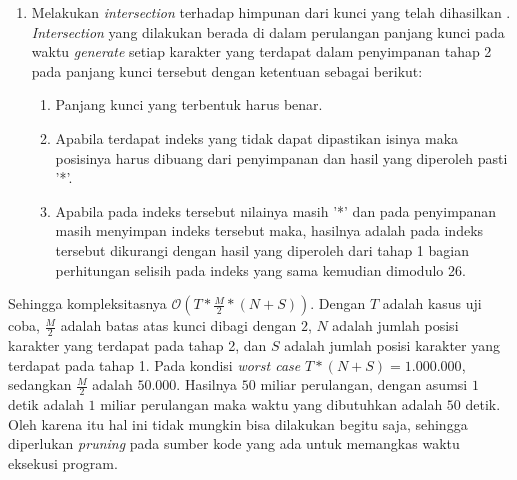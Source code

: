 \begin{enumerate}
	\item Melakukan \textit{intersection} terhadap himpunan dari kunci yang telah dihasilkan  \cite{john_jones_spoj_2009}. \textit{Intersection} yang dilakukan berada di dalam perulangan panjang kunci pada waktu \textit{generate} setiap karakter yang terdapat dalam penyimpanan tahap 2 pada panjang kunci tersebut dengan ketentuan sebagai berikut:
	\begin{enumerate}
	\item Panjang kunci yang terbentuk harus benar.
	\item Apabila terdapat indeks yang tidak dapat dipastikan isinya maka posisinya harus dibuang dari penyimpanan dan hasil yang diperoleh pasti '*'.
	\item Apabila \plaintext pada indeks tersebut nilainya masih '*' dan pada penyimpanan masih menyimpan indeks tersebut maka, hasilnya adalah \ciphertext pada indeks tersebut dikurangi dengan hasil yang diperoleh dari tahap 1 bagian perhitungan selisih pada indeks yang sama kemudian dimodulo 26.
	\end{enumerate}
	\end{enumerate}
	Sehingga kompleksitasnya 
	$\mathcal{O}(T*\frac{M}{2}*(N+S))$.
	Dengan $T$ adalah kasus uji coba, $\frac{M}{2}$ adalah batas atas kunci dibagi dengan $2$, $N$ adalah jumlah posisi karakter yang terdapat pada tahap 2, dan $S$ adalah jumlah posisi karakter yang terdapat pada tahap 1. Pada kondisi \textit{worst case} $T*(N+S)=1.000.000$, sedangkan $\frac{M}{2}$ adalah $50.000$. Hasilnya $50$ miliar perulangan, dengan asumsi $1$ detik adalah $1$ miliar perulangan maka waktu yang dibutuhkan adalah $50$ detik. Oleh karena itu hal ini tidak mungkin bisa dilakukan begitu saja, sehingga diperlukan \textit{pruning} pada sumber kode yang ada untuk memangkas waktu eksekusi program.